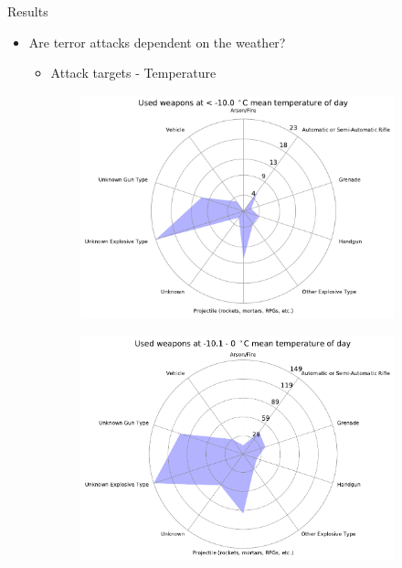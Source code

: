 \documentclass{beamer}
\begin{document}
\begin{frame}{Results}
	\begin{itemize}
		\item 
		Are terror attacks dependent on the weather?
		\begin{itemize}
			\item Attack targets - Temperature
		\end{itemize}
	\end{itemize}
	
	\begin{figure}

		\begin{subfigure}[b]{0.3\textwidth}
			\includegraphics[width=\textwidth]{Temp-Weapon/temp<-100_starDiagram}
		\end{subfigure}
		\begin{subfigure}[b]{0.3\textwidth}
			\includegraphics[width=\textwidth]{Temp-Weapon/temp-101-0_starDiagram}

\end{subfigure}
\end{figure}
\end{frame}
\end{document}
